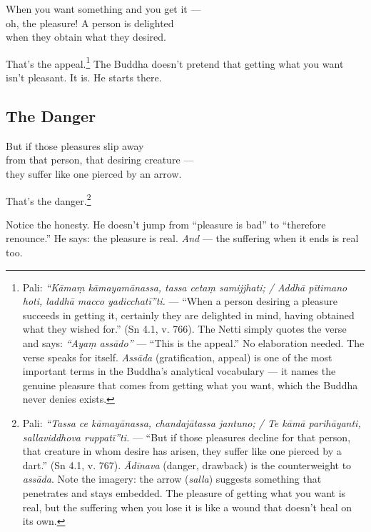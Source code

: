 \begin{versebox}
When you want something and you get it ---\\
oh, the pleasure! A person is delighted\\
when they obtain what they desired.
\end{versebox}

That's the appeal.\footnote{Pali: \textit{``Kāmaṃ kāmayamānassa, tassa cetaṃ samijjhati; / Addhā pītimano hoti, laddhā macco yadicchatī''ti.} --- ``When a person desiring a pleasure succeeds in getting it, certainly they are delighted in mind, having obtained what they wished for.'' (Sn 4.1, v. 766). The Netti simply quotes the verse and says: \textit{``Ayaṃ assādo''} --- ``This is the appeal.'' No elaboration needed. The verse speaks for itself. \textit{Assāda} (gratification, appeal) is one of the most important terms in the Buddha's analytical vocabulary --- it names the genuine pleasure that comes from getting what you want, which the Buddha never denies exists.} The Buddha doesn't pretend that getting what you want isn't pleasant. It is. He starts there.

\subsection*{The Danger}

\begin{versebox}
But if those pleasures slip away\\
from that person, that desiring creature ---\\
they suffer like one pierced by an arrow.
\end{versebox}

That's the danger.\footnote{Pali: \textit{``Tassa ce kāmayānassa, chandajātassa jantuno; / Te kāmā parihāyanti, sallaviddhova ruppatī''ti.} --- ``But if those pleasures decline for that person, that creature in whom desire has arisen, they suffer like one pierced by a dart.'' (Sn 4.1, v. 767). \textit{Ādīnava} (danger, drawback) is the counterweight to \textit{assāda}. Note the imagery: the arrow (\textit{salla}) suggests something that penetrates and stays embedded. The pleasure of getting what you want is real, but the suffering when you lose it is like a wound that doesn't heal on its own.}

Notice the honesty. He doesn't jump from ``pleasure is bad'' to ``therefore renounce.'' He says: the pleasure is real. \textit{And} --- the suffering when it ends is real too.

